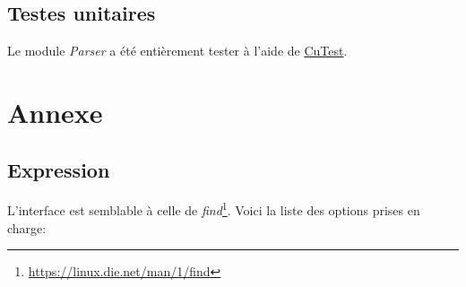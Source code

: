 \documentclass[11pt, a4paper]{article}
\begin{document}
\subsection{Testes unitaires}

Le module \textit{Parser} a été entièrement tester à l'aide de \href{http://cutest.sourceforge.net/}{CuTest}.

\newpage

\section{Annexe}
\subsection{Expression}
\label{ann_exp}
L'interface est semblable à celle de \textit{find}\footnote{\url{https://linux.die.net/man/1/find}}.
Voici la liste des options prises en charge:\\
\end{document}

